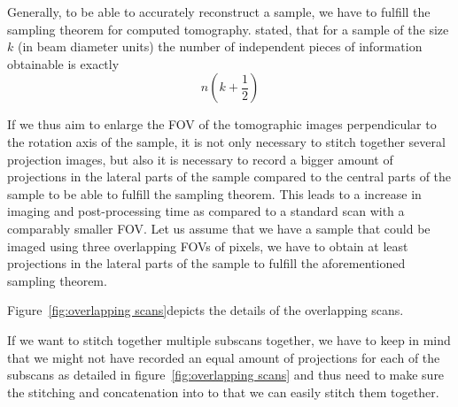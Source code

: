 Generally, to be able to accurately reconstruct a sample, we have to fulfill the sampling theorem for computed tomography. \citet{Cormack1978} stated, that for a sample of the size $k$ (in beam diameter units) the number of independent pieces of information obtainable is exactly
\begin{equation}
n(k+\frac{1}{2})%
\end{equation}


If we thus aim to enlarge the FOV of the tomographic images perpendicular to the rotation axis of the sample, it is not only necessary to stitch together several projection images, but also it is necessary to record a bigger amount of projections in the lateral parts of the sample compared to the central parts of the sample to be able to fulfill the sampling theorem. This leads to a increase in imaging and post-processing time as compared to a standard scan with a comparably smaller FOV. Let us assume that we have a sample that could be imaged using three overlapping FOVs of \unit{}{pixels}, we have to obtain at least \unit{}{projections} in the lateral parts of the sample to fulfill the aforementioned sampling theorem.

Figure~\ref{fig:overlapping scans}depicts the details of the overlapping scans.



If we want to stitch together multiple subscans together, we have to keep in mind that we might not have recorded an equal amount of projections for each of the subscans as detailed in figure~\ref{fig:overlapping scans} and thus need to make sure the stitching and concatenation into to that we can easily stitch them together.

